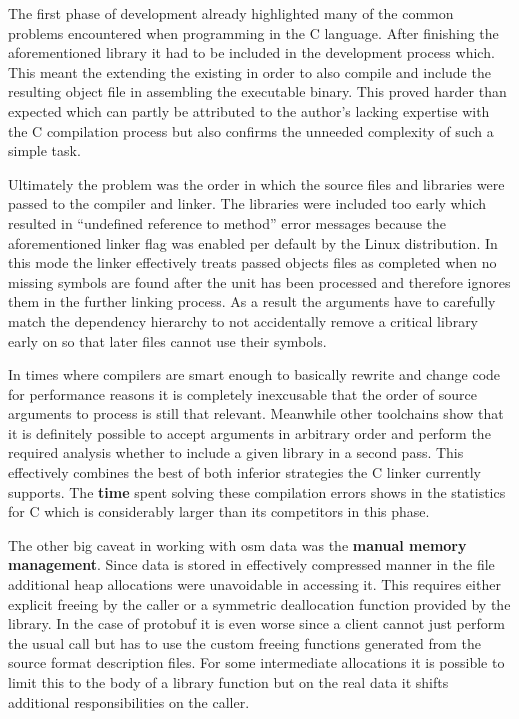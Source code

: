 The first phase of development already highlighted many of the common problems encountered when programming in the C language. After finishing the aforementioned library it had to be included in the development process which. This meant the extending the existing  in order to also compile  and include the resulting object file in assembling the executable binary. This proved harder than expected which can partly be attributed to the author's lacking expertise with the C compilation process but also confirms the unneeded complexity of such a simple task.

Ultimately the problem was the order in which the source files and libraries were passed to the compiler and linker. The libraries were included too early which resulted in ``undefined reference to method'' error messages because the aforementioned linker flag  was enabled per default by the Linux distribution. In this mode the linker effectively treats passed objects files as completed when no missing symbols are found after the unit has been processed and therefore ignores them in the further linking process. As a result the arguments have to carefully match the dependency hierarchy to not accidentally remove a critical library early on so that later files cannot use their symbols.

In times where compilers are smart enough to basically rewrite and change code for performance reasons it is completely inexcusable that the order of source arguments to process is still that relevant. Meanwhile other toolchains show that it is definitely possible to accept arguments in arbitrary order and perform the required analysis whether to include a given library in a second pass. This effectively combines the best of both inferior strategies the C linker currently supports. The \textbf{time} spent solving these compilation errors shows in the statistics for C which is considerably larger than its competitors in this phase.

The other big caveat in working with \gls{osm} data was the \textbf{manual memory management}. Since data is stored in effectively compressed manner in the file additional heap allocations were unavoidable in accessing it. This requires either explicit freeing by the caller or a symmetric deallocation function provided by the library. In the case of \gls{protobuf} it is even worse since a client cannot just perform the usual  call but has to use the custom freeing functions generated from the source  format description files. For some intermediate allocations it is possible to limit this to the body of a library function but on the real data it shifts additional responsibilities on the caller.
\\


